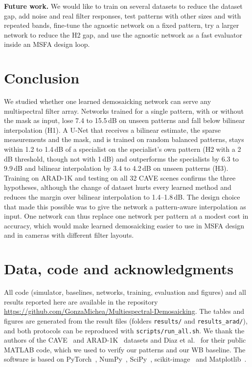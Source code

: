 \documentclass{article}
\begin{document}
\textbf{Future work.} We would like to train on several datasets to reduce
the dataset gap, add noise and real filter responses, test patterns with
other sizes and with repeated bands, fine-tune the agnostic network on a
fixed pattern, try a larger network to reduce the H2 gap, and use the
agnostic network as a fast evaluator inside an MSFA design loop.

\section{Conclusion}
\label{sec:conclusion}

We studied whether one learned demosaicking network can serve any
multispectral filter array. Networks trained for a single pattern, with or
without the mask as input, lose 7.4 to 15.5\,dB on unseen patterns and fall
below bilinear interpolation (H1). A U-Net that receives a bilinear
estimate, the sparse measurements and the mask, and is trained on random
balanced patterns, stays within 1.2 to 1.4\,dB of a specialist on the
specialist's own pattern (H2 with a 2\,dB threshold, though not with 1\,dB)
and outperforms the specialists by 6.3 to 9.9\,dB and bilinear interpolation
by 3.4 to 4.2\,dB on unseen patterns (H3). Training on ARAD-1K and testing
on all 32 CAVE scenes confirms the three hypotheses, although the change of
dataset hurts every learned method and reduces the margin over bilinear
interpolation to 1.4--1.8\,dB. The design choice that made this possible
was to give the network a pattern-aware interpolation as input. One network
can thus replace one network per pattern at a modest cost in accuracy,
which would make learned demosaicking easier to use in MSFA design and in
cameras with different filter layouts.

\section{Data, code and acknowledgments}
\label{sec:ack}

{\sloppy  %
All code (simulator, baselines, networks, training, evaluation and
figures) and all results reported here are available in the repository
{\small\url{https://github.com/GonzaMichea/Multiespectral-Demosaicking}}.
The tables
and figures are generated from the result files (folders
\texttt{results/} and \texttt{results\_arad/}), and both protocols can be reproduced with
\texttt{scripts/run\_all.sh}. We thank the authors of the CAVE~\cite{yasuma2010}
and ARAD-1K~\cite{arad2022} datasets and Diaz et
al.~\cite{diaz2023} for their public MATLAB code, which we used to verify our
patterns and our WB baseline. The software is based on
PyTorch~\cite{paszke2019}, NumPy~\cite{harris2020},
SciPy~\cite{virtanen2020}, scikit-image~\cite{vanderwalt2014} and
Matplotlib~\cite{hunter2007}.\par}

\begingroup
\small


\endgroup
\end{document}
